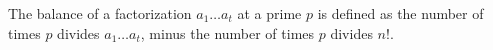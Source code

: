 \begin{definition}
\label{balance-def}
\leanok
The balance of a factorization $a_1 \dots a_t$ at a prime $p$ is defined as the number of
  times $p$ divides $a_1 \dots a_t$, minus the number of times $p$ divides $n!$.
\end{definition}
